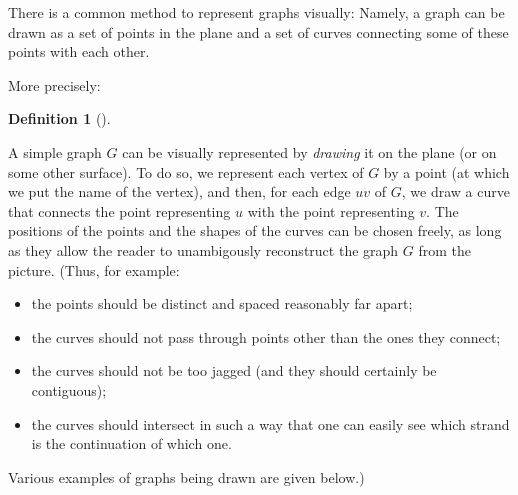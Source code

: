 \documentclass[numbers=enddot,12pt,final,onecolumn,notitlepage]{scrartcl}%
\theoremstyle{definition}
\newtheorem{defi}[theo]{Definition}
\newenvironment{definition}[1][]
{\begin{defi}[#1]\begin{leftbar}}
{\end{leftbar}\end{defi}}
\begin{document}
There is a common method to represent graphs visually: Namely, a graph
can be drawn as a set of points in the plane and a set of curves
connecting some of these points with each other.

More precisely:

\begin{definition} \label{def.intro.draw}
A simple graph $G$ can be visually represented by
\textit{drawing} it on the plane (or on some other surface).
To do so, we represent each vertex of $G$ by a point (at which we
put the name of the vertex),
and then, for each edge $uv$ of $G$, we draw a
curve that connects the point representing $u$ with the point
representing $v$. The positions of the points and the shapes of the
curves can be chosen freely, as long as they allow the reader to
unambigously reconstruct the graph $G$ from the picture.
(Thus, for example:
\begin{itemize}
\item the points should be distinct and spaced
reasonably far apart;
\item the curves should not pass through points other than the ones
they connect;
\item the curves should not be too jagged (and they should certainly
be contiguous);
\item the curves should intersect in such a way that one can easily
see which strand is the continuation of which one.
\end{itemize}
Various examples of graphs being drawn are given below.)
\end{definition}
\end{document}

